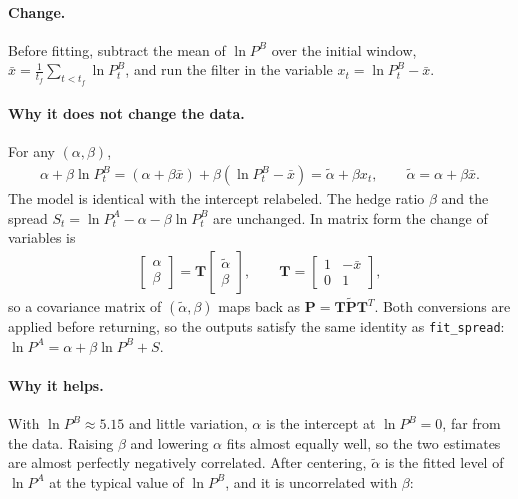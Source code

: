 \documentclass[11pt]{article}
\newcommand{\bs}[1]{\boldsymbol{#1}}
\begin{document}
\paragraph{Change.} Before fitting, subtract the mean of $\ln P^B$ over the
initial window, $\bar{x} = \frac{1}{t_f}\sum_{t<t_f} \ln P^B_t$, and run the
filter in the variable $x_t = \ln P^B_t - \bar{x}$.

\paragraph{Why it does not change the data.} For any $(\alpha, \beta)$,
\begin{gather*}
    \alpha + \beta \ln P^B_t = (\alpha + \beta\bar{x}) + \beta(\ln P^B_t - \bar{x})
    = \tilde{\alpha} + \beta x_t,
    \qquad \tilde{\alpha} = \alpha + \beta\bar{x}.
\end{gather*}
The model is identical with the intercept relabeled. The hedge ratio $\beta$ and
the spread $S_t = \ln P^A_t - \alpha - \beta\ln P^B_t$ are unchanged. In matrix
form the change of variables is
\begin{gather*}
    \begin{bmatrix}\alpha\\ \beta\end{bmatrix} = \bs{T}
    \begin{bmatrix}\tilde{\alpha}\\ \beta\end{bmatrix},
    \qquad
    \bs{T} = \begin{bmatrix} 1 & -\bar{x} \\ 0 & 1 \end{bmatrix},
\end{gather*}
so a covariance matrix of $(\tilde\alpha, \beta)$ maps back as
$\bs{P} = \bs{T}\tilde{\bs{P}}\bs{T}^T$. Both conversions are applied before
returning, so the outputs satisfy the same identity as \texttt{fit\_spread}:
$\ln P^A = \alpha + \beta \ln P^B + S$.

\paragraph{Why it helps.} With $\ln P^B \approx 5.15$ and little variation,
$\alpha$ is the intercept at $\ln P^B = 0$, far from the data. Raising $\beta$
and lowering $\alpha$ fits almost equally well, so the two estimates are almost
perfectly negatively correlated. After centering, $\tilde\alpha$ is the fitted
level of $\ln P^A$ at the typical value of $\ln P^B$, and it is uncorrelated
with $\beta$:
\end{document}
